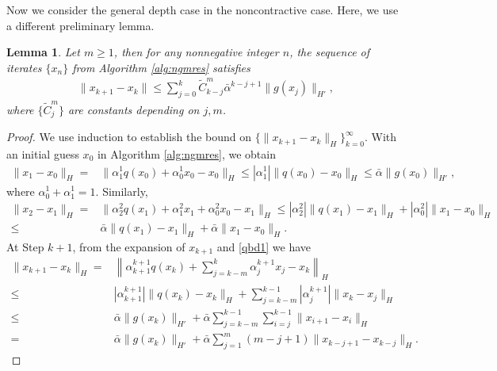 \documentclass{article}
\numberwithin{equation}{section}
\newtheorem{lemma}[thm]{Lemma}
\begin{document}
Now we consider the general depth case in the noncontractive case. Here, we use a different preliminary lemma.
\begin{lemma} 
\label{lemma1}
Let $m\ge 1$, then for any nonnegative integer $n$, the sequence of iterates $\{ x_n \}$ from Algorithm \ref{alg:ngmres} satisfies
\begin{align}
 \| x_{k+1} - x_k\| \le \sum\limits_{j=0}^{k} \widetilde C_{k-j}^m \bar\alpha^{k-j+1} \|g(x_j)\|_{H'},
 \label{ineq:induc}
\end{align}
where $\{ \widetilde C_{j}^m \}$ are constants depending on $j,m$.
\end{lemma}
\begin{proof}
We use induction to establish the bound on  $\{ \|x_{k+1} - x_k\|_H \}_{k=0}^\infty$.
With an initial guess $x_0$ in Algorithm \ref{alg:ngmres}, we obtain 
\begin{align*}
 \|x_1  - x_0\|_{H} =&  \| \alpha^1_1 q(x_0) + \alpha_0^1 x_0 - x_0\|_{H} 
 \le  | \alpha^1_1| \| q(x_0) - x_0\|_{H} \le \bar \alpha \|g(x_0)\|_{H'},
\end{align*}
 where $\alpha_0^1+ \alpha_1^1 =1$. 
 Similarly,
 \begin{align*}
 \| x_2 - x_1\|_{H}  = & \| \alpha_2^2 q(x_1) + \alpha_1^2 x_1 + \alpha_0^2 x_0 - x_1\|_{H} 
 \le |\alpha_2^2| \| q(x_1)-x_1\|_H + |\alpha_0^2 | \| x_1-x_0\|_{H}
\\
  \le& \bar \alpha \| q(x_1)-x_1\|_H + \bar \alpha \| x_1-x_0\|_{H}.
 \end{align*}
At Step $k+1$, from the expansion of $x_{k+1}$ and \eqref{qbd1} we have
 \begin{align*}
 \| x_{k+1} - x_k\|_{H}  = & \left\| \alpha^{k+1}_{k+1} q(x_k) + \sum\limits_{j= k-m}^k \alpha_j^{k+1} x_j  - x_k \right\|_{H}
 \\
 \le & | \alpha^{k+1}_{k+1}|  \| q(x_k)  - x_k \|_{H}+ \sum\limits_{j= k-m}^{k-1} |\alpha_j^{k+1}| \| x_k - x_j\|_{H}
 \\
 \le & \bar \alpha \|g(x_k)\|_{H'} + \bar \alpha \sum\limits_{j=k-m}^{k-1} \sum\limits_{i = j }^{k-1} \| x_{i+1} - x_{i}\| _{H}
 \\
  = &  \bar \alpha \| g(x_k)\|_{H'} + \bar\alpha \sum_{j=1}^{m} (m-j+ 1) \|x_{k-j+1} - x_{k-j}\|_H.

\end{align*}
\end{proof}
\end{document}
